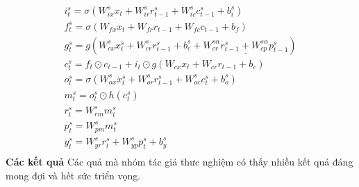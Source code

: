 \documentclass{article}
\begin{document}
	\begin{gather*}
		i^{s}_t = \sigma(W^{s}_{ix}x_t + W^{s}_{ir}r^{s}_{t-1} + W^{s}_{ic}c^{s}_{t-1}+b^{s}_i)\\
		f^{s}_t = \sigma(W_{fx}x_t + W_{fr}r_{t-1} + W_{fc}c_{t-1}+b_f)\\
		g^{s}_t = g(W^{s}_{cx}x^{s}_t + W^{s}_{cr}r^{s}_{t-1} + b^{s}_{c} + \underline{W^{s\alpha}_{cr}r^{s}_{t-1} + W^{s\alpha}_{cp}p^{s}_{t-1}})\\
		c^{s}_t = f_t \odot c_{t-1} + i_t \odot g(W_{cx}x_t + W_{cr}r_{t-1} + b_c)\\
		o^{s}_t = \sigma(W^{s}_{ox}x^{s}_t + W^{s}_{or}r^{s}_{t-1} + W^{s}_{oc}c^{s}_t + b^{s}_o)\\
		m^{s}_t = o^{s}_t \odot h(c^{s}_t)\\
		r^{s}_t = W^{s}_{rm}m^{s}_t\\
		p^{s}_t = W^{s}_{pm}m^{s}_t\\
		y^{s}_t = W^{s}_{yr}r^{s}_t + W^{s}_{yp}p^{s}_t + b^{s}_y\\
	\end{gather*}
	\textbf{Các kết quả}
	Các quả mà nhóm tác giả thưc nghiệm có thấy nhiều kết quả đáng mong đợi và hết sức triển vọng.
	
\end{document}
